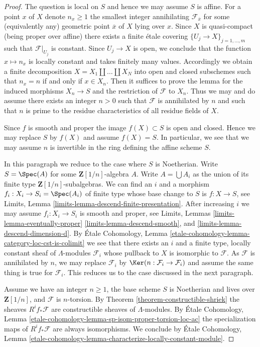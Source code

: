 \begin{proof}
The question is local on $S$ and hence we may assume $S$ is affine.
For a point $x$ of $X$ denote $n_x \geq 1$
the smallest integer annihilating $\mathcal{F}_{\overline{x}}$
for some (equivalently any) geometric point $\overline{x}$ of $X$
lying over $x$. Since $X$ is quasi-compact (being proper over affine)
there exists a finite \'etale covering $\{U_j \to X\}_{j = 1, \ldots, m}$
such that $\mathcal{F}|_{U_j}$ is constant. Since $U_j \to X$
is open, we conclude that the function $x \mapsto n_x$ is locally
constant and takes finitely many values. Accordingly we
obtain a finite decomposition $X = X_1 \amalg \ldots \amalg X_N$
into open and closed subschemes such that $n_x = n$ if and only if $x \in X_n$.
Then it suffices to prove the lemma for the induced
morphisms $X_n \to S$ and the restriction of $\mathcal{F}$ to $X_n$.
Thus we may and do assume there exists an integer $n > 0$ such
that $\mathcal{F}$ is annihilated by $n$ and such that $n$
is prime to the residue characteristics of all residue fields of $X$.

\medskip\noindent
Since $f$ is smooth and proper the image $f(X) \subset S$ is open and closed.
Hence we may replace $S$ by $f(X)$ and assume $f(X) = S$. In particular,
we see that we may assume $n$ is invertible in the ring defining the
affine scheme $S$.

\medskip\noindent
In this paragraph we reduce to the case where $S$ is Noetherian.
Write $S = \Spec(A)$ for some $\mathbf{Z}[1/n]$-algebra $A$.
Write $A = \bigcup A_i$ as the union of its finite type
$\mathbf{Z}[1/n]$-subalgebras. We can find an $i$ and a morphism
$f_i : X_i \to S_i = \Spec(A_i)$ of finite
type whose base change to $S$ is $f : X \to S$, see
Limits, Lemma \ref{limits-lemma-descend-finite-presentation}.
After increasing $i$ we may assume $f_i : X_i \to S_i$ is
smooth and proper, see Limits, Lemmas
\ref{limits-lemma-eventually-proper}
\ref{limits-lemma-descend-smooth}, and
\ref{limits-lemma-descend-dimension-d}.
By \'Etale Cohomology, Lemma
\ref{etale-cohomology-lemma-category-loc-cst-is-colimit}
we see that there exists an $i$ and a finite type,
locally constant sheaf of $\Lambda$-modules
$\mathcal{F}_i$ whose pullback to $X$ is isomorphic to $\mathcal{F}$.
As $\mathcal{F}$ is annihilated by $n$, we may replace
$\mathcal{F}_i$ by $\Ker(n : \mathcal{F}_i \to \mathcal{F}_i)$
and assume the same thing is true for $\mathcal{F}_i$.
This reduces us to the case discussed in the next paragraph.

\medskip\noindent
Assume we have an integer $n \geq 1$, the base scheme $S$ is Noetherian
and lives over $\mathbf{Z}[1/n]$, and $\mathcal{F}$ is $n$-torsion.
By Theorem \ref{theorem-constructible-shriek}
the sheaves $R^if_*\mathcal{F}$ are constructible sheaves of $\Lambda$-modules.
By \'Etale Cohomology, Lemma
\ref{etale-cohomology-lemma-sp-isom-proper-torsion-loc-ac}
the specialization maps of $R^if_*\mathcal{F}$ are always isomorphisms.
We conclude by \'Etale Cohomology, Lemma
\ref{etale-cohomology-lemma-characterize-locally-constant-module}.
\end{proof}







